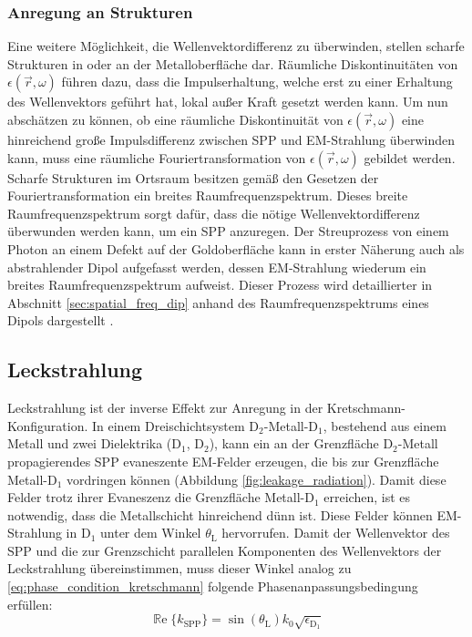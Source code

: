 \documentclass[a4paper, titlepage,  ngerman]{book}
\renewcommand{\Re}{\operatorname{\mathbb{R}e}}
\begin{document}
	\subsubsection{Anregung an Strukturen}
	Eine weitere Möglichkeit, die Wellenvektordifferenz zu überwinden, stellen scharfe Strukturen in oder an der Metalloberfläche dar. Räumliche Diskontinuitäten von $\epsilon(\vec{r},\omega)$ führen dazu, dass die Impulserhaltung, welche erst zu einer Erhaltung des Wellenvektors geführt hat, lokal außer Kraft gesetzt werden kann. Um nun abschätzen zu können, ob eine räumliche Diskontinuität von $\epsilon(\vec{r},\omega)$ eine hinreichend große Impulsdifferenz zwischen SPP und EM-Strahlung überwinden kann, muss eine räumliche Fouriertransformation von $\epsilon(\vec{r},\omega)$ gebildet werden. Scharfe Strukturen im Ortsraum besitzen gemäß den Gesetzen der Fouriertransformation ein breites Raumfrequenzspektrum. Dieses breite Raumfrequenzspektrum sorgt dafür, dass die nötige Wellenvektordifferenz überwunden werden kann, um ein SPP anzuregen. Der Streuprozess von einem Photon an einem Defekt auf der Goldoberfläche kann in erster Näherung auch als abstrahlender Dipol aufgefasst werden, dessen EM-Strahlung wiederum ein breites Raumfrequenzspektrum aufweist. Dieser Prozess wird detaillierter in Abschnitt \ref{sec:spatial_freq_dip} anhand des Raumfrequenzspektrums eines Dipols dargestellt \cite{Maier.2007}.
	\subsection{Leckstrahlung}
	\label{sec:leakage_radiation}
	Leckstrahlung ist der inverse Effekt zur Anregung in der Kretschmann-Konfiguration. In einem Dreischichtsystem $\mathrm{D}_2$-Metall-$\mathrm{D}_1$, bestehend aus einem Metall und zwei Dielektrika ($\mathrm{D}_1$, $\mathrm{D}_2$), kann ein an der Grenzfläche $\mathrm{D}_2$-Metall propagierendes SPP evaneszente EM-Felder erzeugen, die bis zur Grenzfläche Metall-$\mathrm{D}_1$ vordringen können (Abbildung \ref{fig:leakage_radiation}). Damit diese Felder trotz ihrer Evaneszenz die Grenzfläche Metall-$\mathrm{D}_1$ erreichen, ist es notwendig, dass die Metallschicht hinreichend dünn ist. Diese Felder können EM-Strahlung in $\mathrm{D}_1$ unter dem Winkel $\theta_\mathrm{L}$ hervorrufen. Damit der Wellenvektor des SPP und die zur Grenzschicht parallelen Komponenten des Wellenvektors der Leckstrahlung übereinstimmen, muss dieser Winkel analog zu \eqref{eq:phase_condition_kretschmann} folgende Phasenanpassungsbedingung erfüllen:
	\begin{equation}
		\label{eq:phase_condition}
		\boxed{\Re\{k_{\mathrm{SPP}}\}=\sin(\theta_\mathrm{L}) k_0 \sqrt{\epsilon_{\mathrm{D}_1}}}
	\end{equation}
	
\end{document}
